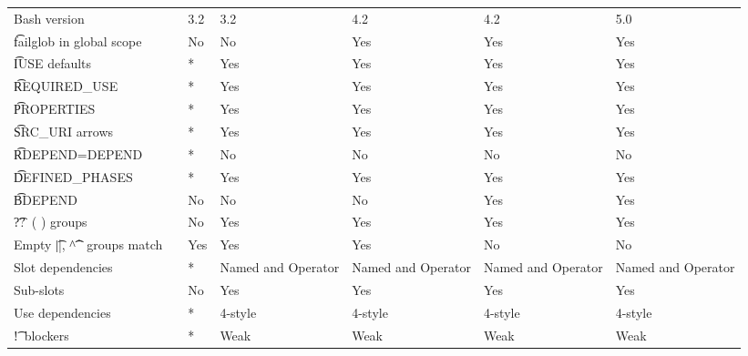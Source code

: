 \begin{landscape}
\begin{longtable}{llP{7.5em}P{7.5em}P{7.5em}P{7.5em}P{7.5em}}
Bash version &  &
    3.2 & 3.2 & 4.2 & 4.2 & 5.0 \\

\t{failglob} in global scope &  &
    No & No & Yes & Yes & Yes \\

\t{IUSE} defaults &  &
    * & Yes & Yes & Yes & Yes \\

\t{REQUIRED_USE} &  &
    * & Yes & Yes & Yes & Yes \\

\t{PROPERTIES} &  &
    * & Yes & Yes & Yes & Yes \\

\t{SRC_URI} arrows &  &
    * & Yes & Yes & Yes & Yes \\

\t{RDEPEND=DEPEND} &  &
    * & No & No & No & No \\

\t{DEFINED_PHASES} &  &
    * & Yes & Yes & Yes & Yes \\

\t{BDEPEND} &  &
    No & No & No & Yes & Yes \\

\t{??\ ( )} groups &  &
    No & Yes & Yes & Yes & Yes \\

Empty \t{||}, \t{\textasciicircum\textasciicircum} groups match &
     &
    Yes & Yes & Yes & No & No \\

Slot dependencies &  &
    * & Named and Operator & Named and Operator & Named and Operator & Named and Operator \\

Sub-slots &  &
    No & Yes & Yes & Yes & Yes \\

Use dependencies &  &
    * & 4-style & 4-style & 4-style & 4-style \\

\t{!}\ blockers &  &
    * & Weak & Weak & Weak & Weak \\


\end{longtable}
\end{landscape}

